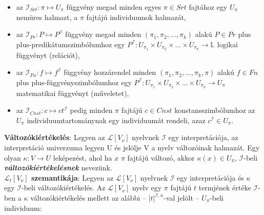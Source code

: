 \documentclass[tikz,12pt,margin=0px]{article}
\newcommand\lword[1]{\leavevmode\nobreak\hskip0pt plus\linewidth\penalty50\hskip0pt plus-\linewidth\nobreak #1}
\begin{document}
	\begin{itemize}
		\item az $\mathcal{I}_{Srt} : \pi \mapsto U_{\pi}$ függvény megad minden egyes $\pi \in Srt$ fajtához egy $U_{\pi}$ nemüres halmazt, a $\pi$ fajtájú individuumok halmazát,
        \item az $\mathcal{I}_{Pr} : P \mapsto P^{\mathcal{I}}$ függvény megad minden $(\pi_{1}, \pi_{2}, \ldots, \pi_{k})$ alakú $P \in Pr$ \lword{predikátumszimbólumhoz} egy $P^{\mathcal{I}} : U_{\pi_{1}} \times U_{\pi_{2}} \times \ldots \times U_{\pi_{k}} \to \mathbb{L}$ logikai függvényt (relációt),
        \item az $\mathcal{I}_{Fn} : f \mapsto f^{\mathcal{I}}$ függvény hozzárendel minden $(\pi_{1}, \pi_{2}, \ldots, \pi_{k}, \pi)$ alakú $f \in Fn$ \lword{függvényszimbólumhoz} egy $P^{\mathcal{I}} : U_{\pi_{1}} \times U_{\pi_{2}} \times \ldots \times U_{\pi_{k}} \to U_{\pi}$ matematikai függvényt (műveletet),
        \item	az $\mathcal{I}_{Cnst} : c \mapsto ct^{\mathcal{I}}$ pedig minden $\pi$ fajtájú $c \in Cnst$ konstansszimbólumhoz az $U_{\pi}$ individuumtartománynak egy individuumát
		rendeli, azaz $c^{\mathcal{I}} \in U_{\pi}$.
 	\end{itemize}
 	
    \noindent \textbf{Változókiértékelés}: Legyen az $\mathcal{L}[V_{\nu}]$ nyelvnek $\mathcal{I}$ egy interpretációja, az interpretáció univerzuma legyen U és jelölje V a nyelv változóinak halmazát. Egy olyan $\kappa : V \to U$ leképezést, ahol ha $x$ $\pi$ fajtájú változó, akkor $\kappa(x) \in U_{\pi}$, $\mathcal{I}$-beli \emph{\textbf{változókiértékelésnek}} nevezünk.\\
 	
 	\noindent \textbf{$\mathcal{L}_{t}[V_{\nu}]$ szemantikája}:
    Legyen az $\mathcal{L}[V_{\nu}]$ nyelvnek $\mathcal{I}$ egy interpretációja és $\kappa$ egy $\mathcal{I}$-beli változókiértékelés. Az $\mathcal{L}[V_{\nu}]$ nyelv egy $\pi$ fajtájú $t$ termjének értéke $\mathcal{I}$-ben a $\kappa$ változókiértékelés mellett az alábbi -- $|t|^{\mathcal{I},\kappa}$-val jelölt -- $U_{\pi}$-beli individuum:
 	
\end{document}
